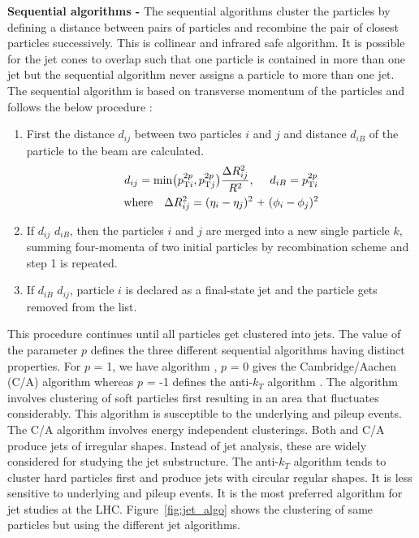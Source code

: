 {\bf Sequential algorithms -} The sequential algorithms \cite{Ellis:1993tq} cluster the particles by defining a distance between pairs of particles and recombine the pair of closest particles successively. This is collinear and infrared safe algorithm. It is possible for the jet cones to overlap such that one particle is contained in more than one jet but the sequential algorithm never assigns a particle to more than one jet. The sequential algorithm is based on transverse momentum \pt of the particles and follows the below procedure : 
\begin{enumerate}
\item First the distance $d_{ij}$ between two particles $i$ and $j$ and distance $d_{iB}$ of the particle to the beam are calculated.
 \begin{equation}
\begin{gathered}
d_{ij} = {\rm min}\big(p^{2p}_{{\rm T}i},p^{2p}_{{\rm T}j}\big) \frac{\Delta R^2_{ij}}{R^2}, ~~~~d_{iB} = p^{2p}_{{\rm T}i} \\ {\rm where} ~~~\Delta R^2_{ij} = (\eta_i -\eta_j)^{2} ~\plus (\phi_i -\phi_j)^{2}
\end{gathered}
\end{equation}

\item If $d_{ij}$ \ls $d_{iB}$, then the particles $i$ and $j$ are merged into a new single particle $k$, summing four-momenta of two initial particles by recombination scheme and step 1 is repeated. 
\item If $d_{iB}$ \ls $d_{ij}$, particle $i$ is declared as a final-state jet and the particle gets removed from the list. 
\end{enumerate}
This procedure continues until all particles get clustered into jets. The value of the parameter $p$ defines the three different sequential algorithms having distinct properties. For $p$ = 1, we have \kt algorithm \cite{Catani:1993hr,Catani:1992zp}, $p$ = 0 gives the Cambridge/Aachen (C/A) algorithm \cite{Dokshitzer:1997in} whereas $p$ = -1 defines the anti-$k_{T}$ algorithm \cite{Cacciari:2008gp}. The \kt algorithm involves clustering of soft particles first resulting in an area that fluctuates considerably. This algorithm is susceptible to the underlying and pileup events. The C/A algorithm involves energy independent clusterings. Both \kt and C/A produce jets of irregular shapes. Instead of jet analysis, these are widely considered for studying the jet substructure. The anti-$k_{T}$ algorithm tends to cluster hard particles first and produce jets with circular regular shapes. It is less sensitive to underlying and pileup events. It is the most preferred algorithm for jet studies at the LHC. Figure~\ref{fig:jet_algo} shows the clustering of same particles but using the different jet algorithms. 

